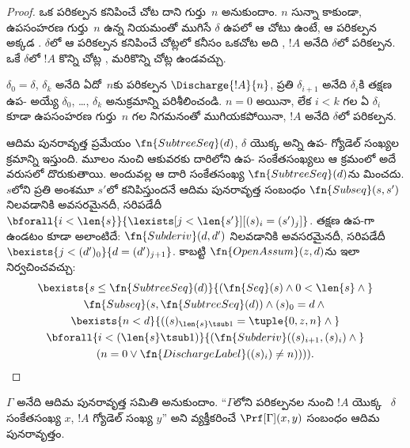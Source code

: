 \documentclass[../../../include/open-logic-section]{subfiles}
\begin{document}
\begin{proof}
  ఒక పరికల్పన కనిపించే చోట దాని గుర్తు~$n$ అనుకుందాం. $n$ సున్నా కాకుండా,
  ఉపసంహరణ గుర్తు~$n$ ఉన్న నియమంతో ముగిసే $\delta$ ఉపలో ఆ
  చోటు ఉంటే, ఆ పరికల్పన అక్కడ .
  $\delta$లో ఆ పరికల్పన కనిపించే చోట్లలో కనీసం ఒకచోట అది
  , $!A$ అనేది $\delta$లో
   పరికల్పన. ఒకే $\delta$లో $!A$
  కొన్ని చోట్ల , మరికొన్ని చోట్ల
   ఉండవచ్చు.

  $\delta_0=\delta$, $\delta_k$ అనేది ఏదో~$n$కు పరికల్పన
  $\Discharge{!A}{n}$, ప్రతి $\delta_{i+1}$ అనేది $\delta_i$కి తక్షణ
  ఉప- అయ్యే $\delta_0$, \dots,
$\delta_k$ అనుక్రమాన్ని పరిశీలించండి. $n=0$ అయినా, లేక $i<k$ గల ఏ
  $\delta_i$ కూడా ఉపసంహరణ గుర్తు~$n$ గల నిగమనంతో ముగియకపోయినా, $!A$ అనేది $\delta$లో
   పరికల్పన.

  ఆదిమ పునరావృత్త ప్రమేయం $\fn{SubtreeSeq}(d)$, $\delta$ యొక్క అన్ని
  ఉప- గ్యోడెల్ సంఖ్యల క్రమాన్ని
  ఇస్తుంది. మూలం నుంచి ఆకువరకు దారిలోని
  ఉప- సంకేతసంఖ్యలు ఆ క్రమంలో అదే వరుసలో
  దొరుకుతాయి. అందువల్ల ఆ దారి సంకేతసంఖ్య $\fn{SubtreeSeq}(d)$ను మించదు.
  $s$లోని ప్రతి అంశమూ $s'$లో కనిపిస్తుందనే ఆదిమ పునరావృత్త సంబంధం
  $\fn{Subseq}(s,s')$ నిలవడానికి అవసరమైనదీ, సరిపడేదీ
  $\bforall{i<\len{s}}{\lexists[j<\len{s'}][(s)_i=(s')_j]}$.
  తక్షణ ఉప-గా ఉండటం కూడా అలాంటిదే:
  $\fn{Subderiv}(d,d')$ నిలవడానికి అవసరమైనదీ, సరిపడేదీ
  $\bexists{j<(d')_0}{d=(d')_{j+1}}$.
  కాబట్టి $\fn{OpenAssum}(z,d)$ను ఇలా నిర్వచించవచ్చు:
  \begin{multline*}
    \bexists{s\leq\fn{SubtreeSeq}(d)}{(\fn{Seq}(s)\land 0<\len{s}\land{}}\\
      \fn{Subseq}(s,\fn{SubtreeSeq}(d))\land(s)_0=d\land{}\\
    \bexists{n<d}{((s)_{\len{s}\tsub 1}=\tuple{0,z,n}\land{}}\\
      \bforall{i<(\len{s}\tsub 1)}{(\fn{Subderiv}((s)_{i+1},(s)_i)\land{}}\\
      (n=0\lor\fn{DischargeLabel}((s)_i)\neq n)))).
  \end{multline*}
\end{proof}

\begin{prop}
  $\Gamma$ అనేది  ఆదిమ పునరావృత్త సమితి
  అనుకుందాం. ``$\Gamma$లోని 
  పరికల్పనల నుంచి $!A$ యొక్క 
  ~$\delta$ సంకేతసంఖ్య $x$, $!A$ గ్యోడెల్ సంఖ్య $y$'' అని వ్యక్తీకరించే
  $\Prf[\Gamma](x,y)$ సంబంధం ఆదిమ పునరావృత్తం.
\end{prop}
\end{document}
